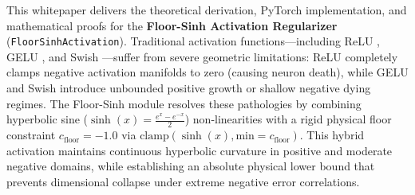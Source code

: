 \begin{abstractbox}
This whitepaper delivers the theoretical derivation, PyTorch implementation, and mathematical proofs for the \textbf{Floor-Sinh Activation Regularizer} (\texttt{FloorSinhActivation}). Traditional activation functions—including ReLU \cite{nair2010rectified}, GELU \cite{hendrycks2016gaussian}, and Swish \cite{ramachandran2017searching}—suffer from severe geometric limitations: ReLU completely clamps negative activation manifolds to zero (causing neuron death), while GELU and Swish introduce unbounded positive growth or shallow negative dying regimes. The Floor-Sinh module resolves these pathologies by combining hyperbolic sine ($\sinh(x) = \frac{e^x - e^{-x}}{2}$) non-linearities with a rigid physical floor constraint $c_{\text{floor}} = -1.0$ via $\text{clamp}(\sinh(x), \text{min}=c_{\text{floor}})$. This hybrid activation maintains continuous hyperbolic curvature in positive and moderate negative domains, while establishing an absolute physical lower bound that prevents dimensional collapse under extreme negative error correlations.
\end{abstractbox}
